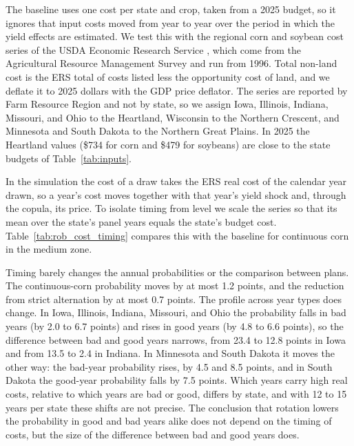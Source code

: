 \documentclass[11pt,letterpaper]{article}
\theoremstyle{remark}
\begin{document}
The baseline uses one cost per state and crop, taken from a 2025 budget, so it ignores that input costs moved from year to year over the period in which the yield effects are estimated. We test this with the regional corn and soybean cost series of the USDA Economic Research Service \citep{ERS2026}, which come from the Agricultural Resource Management Survey and run from 1996. Total non-land cost is the ERS total of costs listed less the opportunity cost of land, and we deflate it to 2025 dollars with the GDP price deflator. The series are reported by Farm Resource Region and not by state, so we assign Iowa, Illinois, Indiana, Missouri, and Ohio to the Heartland, Wisconsin to the Northern Crescent, and Minnesota and South Dakota to the Northern Great Plains. In 2025 the Heartland values (\$734 for corn and \$479 for soybeans) are close to the state budgets of Table~\ref{tab:inputs}.

In the simulation the cost of a draw takes the ERS real cost of the calendar year drawn, so a year's cost moves together with that year's yield shock and, through the copula, its price. To isolate timing from level we scale the series so that its mean over the state's panel years equals the state's budget cost. Table~\ref{tab:rob_cost_timing} compares this with the baseline for continuous corn in the medium zone.

\begin{table}[H]
\centering
\caption{Annual breakeven probability (percent) under continuous corn with a fixed cost (Fixed) and with ERS year-specific costs of the same mean (ERS), medium zone. Gap is strict alternation minus continuous corn, in points. Bad and Good are the probabilities in bad and good years.}
\label{tab:rob_cost_timing}
\footnotesize
\setlength{\tabcolsep}{4pt}

\end{table}

Timing barely changes the annual probabilities or the comparison between plans. The continuous-corn probability moves by at most 1.2 points, and the reduction from strict alternation by at most 0.7 points. The profile across year types does change. In Iowa, Illinois, Indiana, Missouri, and Ohio the probability falls in bad years (by 2.0 to 6.7 points) and rises in good years (by 4.8 to 6.6 points), so the difference between bad and good years narrows, from 23.4 to 12.8 points in Iowa and from 13.5 to 2.4 in Indiana. In Minnesota and South Dakota it moves the other way: the bad-year probability rises, by 4.5 and 8.5 points, and in South Dakota the good-year probability falls by 7.5 points. Which years carry high real costs, relative to which years are bad or good, differs by state, and with 12 to 15 years per state these shifts are not precise. The conclusion that rotation lowers the probability in good and bad years alike does not depend on the timing of costs, but the size of the difference between bad and good years does.
\end{document}
